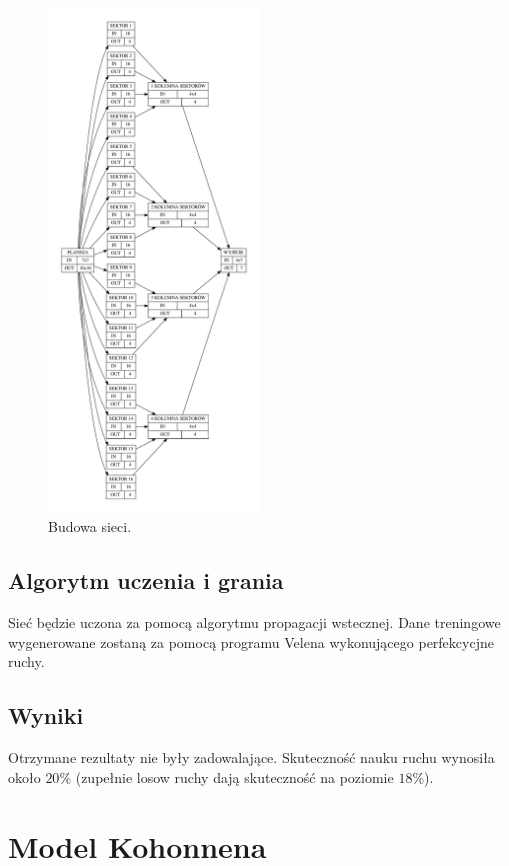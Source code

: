 \documentclass{llncs}
\begin{document}
\begin{figure}[H]
	\centering	
	\includegraphics[width=0.5\textwidth]{img/opis_sieci.pdf}	\caption{Budowa sieci.}
	\label{fig:Siec}
\end{figure}

\subsection{Algorytm uczenia i grania}
Sieć będzie uczona za pomocą algorytmu propagacji wstecznej. Dane treningowe wygenerowane zostaną za pomocą programu Velena\cite{velena} wykonującego perfekcycjne ruchy.

\subsection{Wyniki}
Otrzymane rezultaty nie były zadowalające. Skuteczność nauku ruchu wynosiła około $20\%$ (zupełnie losow ruchy dają skuteczność na poziomie $18\%$).

\section{Model Kohonnena}
\end{document}
